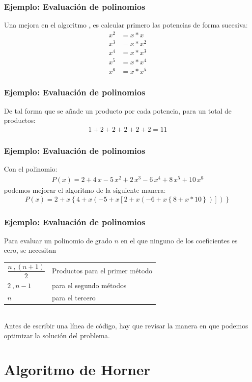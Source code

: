 \documentclass[12pt]{beamer}
\begin{document}
\begin{frame}
\frametitle{Ejemplo: Evaluación de polinomios}
Una mejora en el algoritmo , es calcular primero las potencias de forma sucesiva:
\begin{align*}
x^{2} & = x*x \\
x^{3} & = x*x^{2} \\
x^{4} & = x*x^{3} \\
x^{5} & = x*x^{4} \\
x^{6} & = x*x^{5}
\end{align*}
\end{frame}
\begin{frame}
\frametitle{Ejemplo: Evaluación de polinomios}
De tal forma que se añade un producto por cada potencia, para un total de productos:
\begin{align*}
1 + 2 + 2 + 2 + 2 + 2 = 11
\end{align*}
\end{frame}
\begin{frame}
\frametitle{Ejemplo: Evaluación de polinomios}
Con el polinomio:
\begin{align*}
P (x) = 2 + 4 \, x - 5 \,  x^{2} + 2 \, x^{3} - 6 \, x^{4} + 8 \,  x^{5} + 10 \, x^{6}
\end{align*}
\pause
podemos mejorar el algoritmo de la siguiente manera:
\pause
\fontsize{12}{12}\selectfont
\begin{align*}
P (x) = 2 + x \left\lbrace 4 + x \left( -5 + x \left[ 2 + x \left(-6 +x \left\lbrace 8+x*10 \right\rbrace \right) \right] \right) \right\rbrace 
\end{align*}
\end{frame}
\begin{frame}
\frametitle{Ejemplo: Evaluación de polinomios}
Para evaluar un polinomio de grado $n$ en el que ninguno de los coeficientes es cero, se necesitan
\\
\medskip
\pause
\begin{tabular}{l l}
$\dfrac{n\ , (n + 1)}{2}$ & Productos para el primer método \\
$2\ , n - 1$ & para el segundo métodos \\
$n$ & para el tercero
\end{tabular}
\\
\medskip
\pause
Antes de escribir una línea de código, hay que revisar la manera en que podemos optimizar la solución del problema.
\end{frame}

\section{Algoritmo de Horner}
\end{document}
